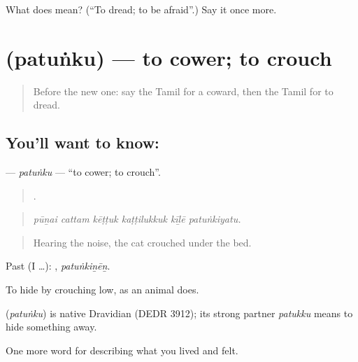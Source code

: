 \begin{tcolorbox}[breakable,colback=teal!4,colframe=teal!35!black,title={Before you move on}]
What does  mean? (\textquotedblleft{}To dread; to be afraid\textquotedblright{}.) Say it once more.
\end{tcolorbox}
\section[\texorpdfstring{\ta{பதுங்கு} (patuṅku)}{பதுங்கு (patuṅku)}]{ (patuṅku) — to cower; to crouch}

\label{lesson:TA-C466-patunku}



\begin{quote}
Before the new one: say the Tamil for a coward, then the Tamil for to dread.
\end{quote}

\subsection*{You'll want to know: }
\textbf{} — \emph{patuṅku} — \textquotedblleft{}to cower; to crouch\textquotedblright{}.

\begin{quote}
     .
\end{quote}

\begin{quote}
\emph{pūṉai cattam kēṭṭuk kaṭṭilukkuk kīḻē patuṅkiyatu.}
\end{quote}

\begin{quote}
Hearing the noise, the cat crouched under the bed.
\end{quote}

Past (I …): , \emph{patuṅkiṉēṉ}.

To hide by crouching low, as an animal does.

\begin{cousinweb}
\textbf{} (\emph{patuṅku}) is native Dravidian (DEDR 3912); its strong partner  \emph{patukku} means to hide something away.
\end{cousinweb}

\begin{grammarlens}[title={What you've built}]
One more word for describing what you lived and felt.
\end{grammarlens}

